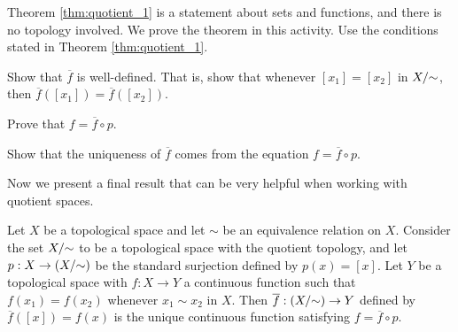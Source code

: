 \begin{activity} Theorem \ref{thm:quotient_1} is a statement about sets and functions, and there is no topology involved. We prove the theorem in this activity. Use the conditions stated in Theorem \ref{thm:quotient_1}.
\ba
\item Show that $\overline{f}$ is well-defined. That is, show that whenever $[x_1] = [x_2]$ in $X/\hspace{-1mm}\sim$, then $\overline{f}([x_1]) =\overline{f}([x_2])$.

\item Prove that $f = \overline{f} \circ p$. 

\item Show that the uniqueness of $\overline{f}$ comes from the equation $f = \overline{f} \circ p$.

\ea

\end{activity}

\begin{comment}

\ActivitySolution

\ba
\item The fact that $f(x_1) = f(x_2)$ whenever $x_1 \sim x_2$ in $X$ makes $\overline{f}$ well-defined. That is, if $[x_1] = [x_2]$ in $X/\ssim$, then $x_1 \sim x_2$ and so 
\[\overline{f}([x_1]) = f(x_1) = f(x_2) = \overline{f}([x_2]).\]

\item To demonstrate that $f = \overline{f} \circ p$, let $x \in  X$. Then 
\[(\overline{f} \circ p)(x) = \overline{f}(p(x)) = \overline{f}([x]) = f(x).\]

\item For uniqueness, if $g : (X/\ssim) \to Y$ satisfies $g \circ p = f$, then $g(p(x)) = g([x]) = f(x)$ for every $x \in X$ and $g = \overline{f}$.

\ea

\end{comment}

Now we present a final result that can be very helpful when working with quotient spaces.

\begin{theorem} \label{thm:quotient_2} Let $X$ be a topological space and let $\sim$ be an equivalence relation on $X$. Consider the set $X/\hspace{-1mm}\sim$ to be a topological space with the quotient topology, and let $p: X \to (X/\hspace{-1mm}\sim)$ be the standard surjection defined by $p(x) = [x]$. Let $Y$ be a topological space with $f: X \to Y$ a continuous function such that $f(x_1) = f(x_2)$ whenever $x_1 \sim x_2$ in $X$. Then $\overline{f} : (X/\hspace{-1mm}\sim) \to Y$ defined by $\overline{f}([x]) = f(x)$ is the unique continuous function satisfying $f = \overline{f} \circ p$.
\end{theorem}

